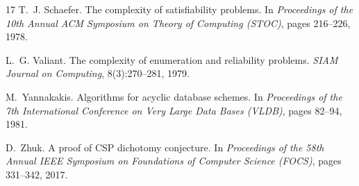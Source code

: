\documentclass[11pt]{article}
\theoremstyle{plain}
\theoremstyle{definition}
\theoremstyle{remark}
\begin{document}
\begin{thebibliography}{17}
 T.~J. Schaefer. The complexity of satisfiability
problems. In \emph{Proceedings of the 10th Annual ACM Symposium on Theory of
Computing (STOC)}, pages 216--226, 1978.

 L.~G. Valiant. The complexity of enumeration and
reliability problems. \emph{SIAM Journal on Computing}, 8(3):270--281, 1979.

 M.~Yannakakis. Algorithms for acyclic database
schemes. In \emph{Proceedings of the 7th International Conference on Very
Large Data Bases (VLDB)}, pages 82--94, 1981.

 D.~Zhuk. A proof of CSP dichotomy conjecture. In
\emph{Proceedings of the 58th Annual IEEE Symposium on Foundations of
Computer Science (FOCS)}, pages 331--342, 2017.

\end{thebibliography}
\end{document}
